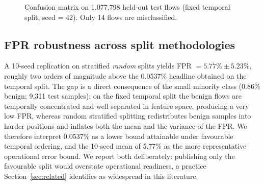 ﻿\documentclass[journal]{IEEEtran}
\begin{document}
\begin{figure}[!t]
\centering
{}
\caption{Confusion matrix on 1,077,798 held-out test flows (fixed temporal split, seed = 42). Only 14 flows are misclassified.}
\label{fig:confusion}
\end{figure}

\subsection{FPR robustness across split methodologies}
A 10-seed replication on stratified \emph{random} splits yields FPR $= 5.77\% \pm 5.23\%$, roughly two orders of magnitude above the 0.0537\% headline obtained on the temporal split. The gap is a direct consequence of the small minority class (0.86\% benign; 9,311 test samples): on the fixed temporal split the benign flows are temporally concentrated and well separated in feature space, producing a very low FPR, whereas random stratified splitting redistributes benign samples into harder positions and inflates both the mean and the variance of the FPR. We therefore interpret 0.0537\% as a lower bound attainable under favourable temporal ordering, and the 10-seed mean of 5.77\% as the more representative operational error bound. We report both deliberately: publishing only the favourable split would overstate operational readiness, a practice Section~\ref{sec:related} identifies as widespread in this literature.
\end{document}
